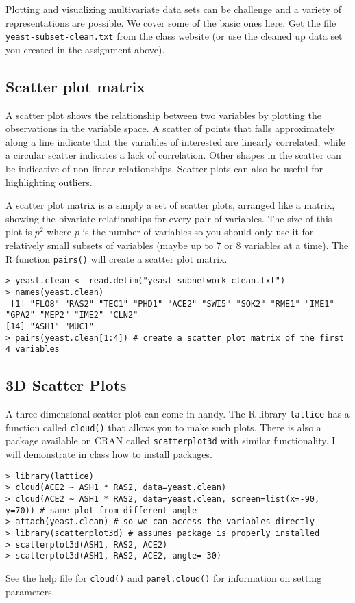 \documentclass{article}
\begin{document}
Plotting and visualizing multivariate data sets can be challenge and a
variety of representations are possible. We cover some of the basic ones
here. Get the file \lstinline!yeast-subset-clean.txt! from the class
website (or use the cleaned up data set you created in the assignment
above).

\subsection{Scatter plot matrix}

A scatter plot shows the relationship between two variables by plotting
the observations in the variable space. A scatter of points that falls
approximately along a line indicate that the variables of interested are
linearly correlated, while a circular scatter indicates a lack of
correlation. Other shapes in the scatter can be indicative of non-linear
relationships. Scatter plots can also be useful for highlighting
outliers.

A scatter plot matrix is a simply a set of scatter plots, arranged like
a matrix, showing the bivariate relationships for every pair of
variables. The size of this plot is $p^2$ where $p$ is the number of
variables so you should only use it for relatively small subsets of
variables (maybe up to 7 or 8 variables at a time). The R function
\lstinline!pairs()! will create a scatter plot matrix.

\begin{lstlisting}
> yeast.clean <- read.delim("yeast-subnetwork-clean.txt")
> names(yeast.clean)
 [1] "FLO8" "RAS2" "TEC1" "PHD1" "ACE2" "SWI5" "SOK2" "RME1" "IME1" "GPA2" "MEP2" "IME2" "CLN2"
[14] "ASH1" "MUC1"
> pairs(yeast.clean[1:4]) # create a scatter plot matrix of the first 4 variables
\end{lstlisting}
\subsection{3D Scatter Plots}

A three-dimensional scatter plot can come in handy. The R library
\lstinline!lattice! has a function called \lstinline!cloud()! that
allows you to make such plots. There is also a package available on CRAN
called \lstinline!scatterplot3d! with similar functionality. I will
demonstrate in class how to install packages.

\begin{lstlisting}
> library(lattice)
> cloud(ACE2 ~ ASH1 * RAS2, data=yeast.clean)
> cloud(ACE2 ~ ASH1 * RAS2, data=yeast.clean, screen=list(x=-90, y=70)) # same plot from different angle
> attach(yeast.clean) # so we can access the variables directly
> library(scatterplot3d) # assumes package is properly installed
> scatterplot3d(ASH1, RAS2, ACE2)
> scatterplot3d(ASH1, RAS2, ACE2, angle=-30)
\end{lstlisting}
See the help file for \lstinline!cloud()! and \lstinline!panel.cloud()!
for information on setting parameters.
\end{document}
